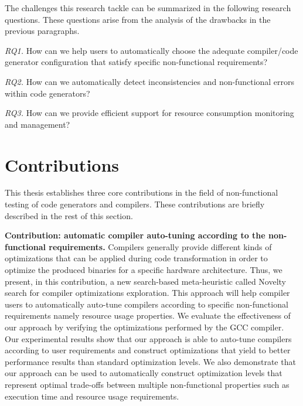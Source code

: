 \begin{itemize}
 


\end{itemize}
The challenges this research tackle can be summarized in the following research questions. These questions arise from the analysis of the drawbacks in the previous paragraphs.

\textit{RQ1.} How can we help users to automatically choose the adequate compiler/code generator configuration that satisfy specific non-functional requirements?

\textit{RQ2.} How can we automatically detect inconsistencies and non-functional errors within code generators?

\textit{RQ3.} How can we provide efficient support for resource consumption monitoring and management?


\section{Contributions}
This thesis establishes three core contributions in the field of non-functional testing of code generators and compilers. 
These contributions are briefly described in the rest of this section.

\textbf{Contribution: automatic compiler auto-tuning according to the non-functional requirements.}
Compilers generally provide different kinds of optimizations that can be applied during code transformation in order to optimize the produced binaries for a specific hardware architecture. Thus, we present, in this contribution, a new search-based meta-heuristic called Novelty search for compiler optimizations exploration. This approach will help compiler users to automatically auto-tune compilers according to specific non-functional requirements namely resource usage properties. 
We evaluate the effectiveness of our approach by verifying the optimizations performed by the GCC compiler.
Our experimental results show that our approach is able to auto-tune compilers according to user requirements and construct optimizations that yield to better performance results than standard optimization levels. We also demonstrate that our approach can be used to automatically construct optimization levels that represent optimal trade-offs between multiple non-functional properties such as execution time and resource usage requirements.

